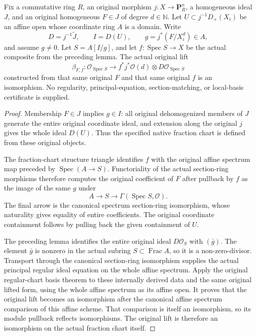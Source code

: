 \begin{theorem}
\label{thm:resume-original-form-actual-fraction-basis}
\leanok
Fix a commutative ring $R$, an original morphism $j:X\to\mathbf P_R^n$,
a homogeneous ideal $J$, and an original homogeneous $F\in J$ of degree
$d\in\mathbb N$. Let $U\subset j^{-1}D_+(X_i)$ be an affine open whose
coordinate ring $A$ is a domain. Write
\[
 D=j^{-1}\widetilde J,\qquad I=D(U),\qquad
 g=j^*(F/X_i^d)\in A,
\]
and assume $g\ne0$. Let $S=A[I/g]$, and let $f:\operatorname{Spec}S\to X$
be the actual composite from the preceding lemma. The actual original lift
\[
 \beta_{F,f}:\mathcal O_{\operatorname{Spec}S}\longrightarrow
          f^*j^*\mathcal O(d)\otimes D\mathcal O_{\operatorname{Spec}S}
\]
constructed from that same original $F$ and that same original $f$ is an
isomorphism. No regularity, principal-equation, section-matching, or
local-basis certificate is supplied.
\end{theorem}
\begin{proof}
Membership $F\in J$ implies $g\in I$: all original dehomogenized members of
$J$ generate the entire original coordinate ideal, and extension along the
original $j$ gives the whole ideal $D(U)$. Thus the specified native fraction
chart is defined from these original objects.

The fraction-chart structure triangle identifies $f$ with the original affine
spectrum map preceded by $\operatorname{Spec}(A\to S)$. Functoriality of the
actual section-ring morphisms therefore computes the original coefficient of
$F$ after pullback by $f$ as the image of the same $g$ under
\[
 A\longrightarrow S\longrightarrow\Gamma(\operatorname{Spec}S,\mathcal O).
\]
The final arrow is the canonical spectrum section-ring isomorphism, whose
naturality gives equality of entire coefficients. The original coordinate
containment follows by pulling back the given containment of $U$.

The preceding lemma identifies the entire original ideal $D\mathcal O_S$
with $(\bar g)$. The element $\bar g$ is nonzero in the actual subring
$S\subset\operatorname{Frac}A$, so it is a non-zero-divisor. Transport through
the canonical section-ring isomorphism supplies the actual principal regular
ideal equation on the whole affine spectrum. Apply the original regular-chart
basis theorem to these internally derived data and the same original lifted
form, using the whole affine spectrum as its affine open. It proves that the
original lift becomes an isomorphism after the canonical affine spectrum
comparison of this affine scheme. That comparison is itself an isomorphism,
so its module pullback reflects isomorphisms. The original lift is therefore
an isomorphism on the actual fraction chart itself.
\end{proof}

